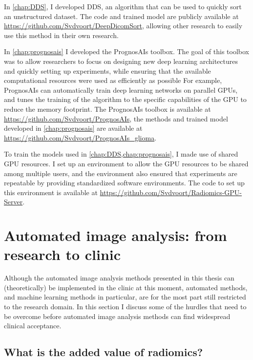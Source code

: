 In \cref{chap:DDS}, I developed \acrlong{DDS}, an algorithm that can be used to quickly sort an unstructured dataset.
The code and trained model are publicly available at \url{https://github.com/Svdvoort/DeepDicomSort}, allowing other research to easily use this method in their own research.


In \cref{chap:prognosais} I developed the PrognosAIs toolbox.
The goal of this toolbox was to allow researchers to focus on designing new deep learning architectures and quickly setting up experiments, while ensuring that the available computational resources were used as efficiently as possible
For example, PrognosAIs can automatically train deep learning networks on parallel GPUs, and tunes the training of the algorithm to the specific capabilities of the GPU to reduce the memory footprint.
The PrognosAIs toolbox is available at \url{https://github.com/Svdvoort/PrognosAIs}, the methods and trained model developed in \cref{chap:prognosais} are available at \url{https://github.com/Svdvoort/PrognosAIs_glioma}.

To train the models used in \cref{chap:DDS,chap:prognosais}, I made use of shared GPU resources.
I set up an environment to allow the GPU resources to be shared among multiple users, and the environment also ensured that experiments are repeatable by providing standardized software environments.
The code to set up this environment is available at \url{https://github.com/Svdvoort/Radiomics-GPU-Server}.




\section{Automated image analysis: from research to clinic}\label{sec:discussion_clinical}

Although the automated image analysis methods presented in this thesis can (theoretically) be implemented in the clinic at this moment, automated methods, and machine learning methods in particular, are for the most part still restricted to the research domain.
In this section I discuss some of the hurdles that need to be overcome before automated image analysis methods can find widespread clinical acceptance.

\subsection{What is the added value of radiomics?}\label{subsec:discussion_added_value_radiomics}

